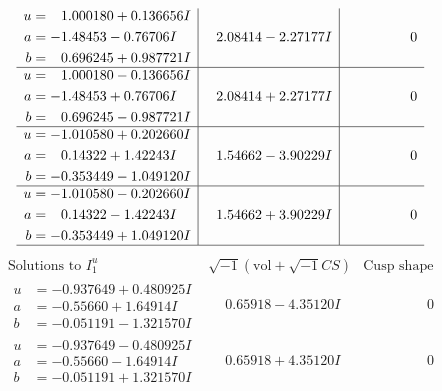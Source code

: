 \documentclass[1p]{elsarticle_modified}
\theoremstyle{definition}
\newcommand{\I}{\sqrt{-1}}
\begin{document}
$$\begin{array}{c|c|c}
\begin{aligned}
u &= \phantom{-}1.000180 + 0.136656 I \\
a &= -1.48453 - 0.76706 I \\
b &= \phantom{-}0.696245 + 0.987721 I\end{aligned}
 & \phantom{-}2.08414 - 2.27177 I & \phantom{-0.000000 } 0 \\ \hline\begin{aligned}
u &= \phantom{-}1.000180 - 0.136656 I \\
a &= -1.48453 + 0.76706 I \\
b &= \phantom{-}0.696245 - 0.987721 I\end{aligned}
 & \phantom{-}2.08414 + 2.27177 I & \phantom{-0.000000 } 0 \\ \hline\begin{aligned}
u &= -1.010580 + 0.202660 I \\
a &= \phantom{-}0.14322 + 1.42243 I \\
b &= -0.353449 - 1.049120 I\end{aligned}
 & \phantom{-}1.54662 - 3.90229 I & \phantom{-0.000000 } 0 \\ \hline\begin{aligned}
u &= -1.010580 - 0.202660 I \\
a &= \phantom{-}0.14322 - 1.42243 I \\
b &= -0.353449 + 1.049120 I\end{aligned}
 & \phantom{-}1.54662 + 3.90229 I & \phantom{-0.000000 } 0\\
 \hline 
 \end{array}$$\newpage$$\begin{array}{c|c|c}  
\text{Solutions to }I^u_{1}& \I (\text{vol} + \sqrt{-1}CS) & \text{Cusp shape}\\
 \hline 
\begin{aligned}
u &= -0.937649 + 0.480925 I \\
a &= -0.55660 + 1.64914 I \\
b &= -0.051191 - 1.321570 I\end{aligned}
 & \phantom{-}0.65918 - 4.35120 I & \phantom{-0.000000 } 0 \\ \hline\begin{aligned}
u &= -0.937649 - 0.480925 I \\
a &= -0.55660 - 1.64914 I \\
b &= -0.051191 + 1.321570 I\end{aligned}
 & \phantom{-}0.65918 + 4.35120 I & \phantom{-0.000000 } 0 \\ \hline\begin{aligned}

\end{aligned}
\end{array}$$
\end{document}
